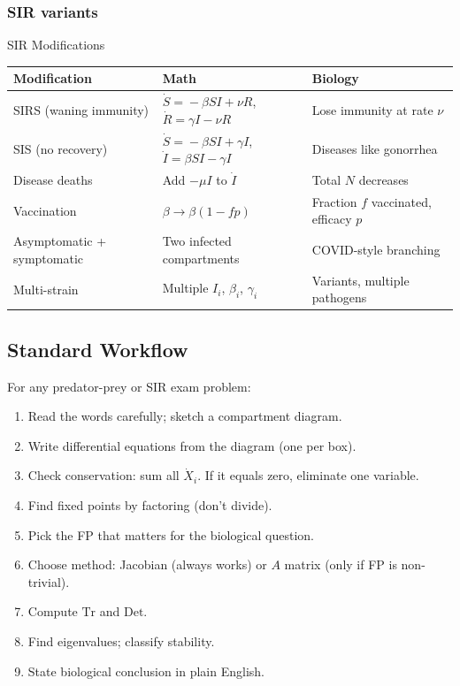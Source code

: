 \documentclass[11pt]{article}
\begin{document}
\subsubsection{SIR variants}

\begin{summarybox}{SIR Modifications}
\renewcommand{\arraystretch}{1.4}
\begin{tabular}{p{4cm}p{5cm}p{6cm}}
\toprule
\textbf{Modification} & \textbf{Math} & \textbf{Biology}\\
\midrule
SIRS (waning immunity) & $\dot S\!=\!-\beta SI + \nu R$,\;$\dot R\!=\!\gamma I - \nu R$ & Lose immunity at rate $\nu$\\
SIS (no recovery) & $\dot S\!=\!-\beta SI + \gamma I$,\;$\dot I\!=\!\beta SI - \gamma I$ & Diseases like gonorrhea\\
Disease deaths & Add $-\mu I$ to $\dot I$ & Total $N$ decreases\\
Vaccination & $\beta \to \beta(1-fp)$ & Fraction $f$ vaccinated, efficacy $p$\\
Asymptomatic + symptomatic & Two infected compartments & COVID-style branching\\
Multi-strain & Multiple $I_i$, $\beta_i$, $\gamma_i$ & Variants, multiple pathogens\\
\bottomrule
\end{tabular}
\end{summarybox}

\subsection{Standard Workflow}

\begin{tipbox}
For any predator-prey or SIR exam problem:
\begin{enumerate}
\item Read the words carefully; sketch a compartment diagram.
\item Write differential equations from the diagram (one per box).
\item Check conservation: sum all $\dot X_i$. If it equals zero, eliminate one variable.
\item Find fixed points by factoring (don't divide).
\item Pick the FP that matters for the biological question.
\item Choose method: Jacobian (always works) or $A$ matrix (only if FP is non-trivial).
\item Compute $\text{Tr}$ and $\text{Det}$.
\item Find eigenvalues; classify stability.
\item State biological conclusion in plain English.
\end{enumerate}
\end{tipbox}
\end{document}
